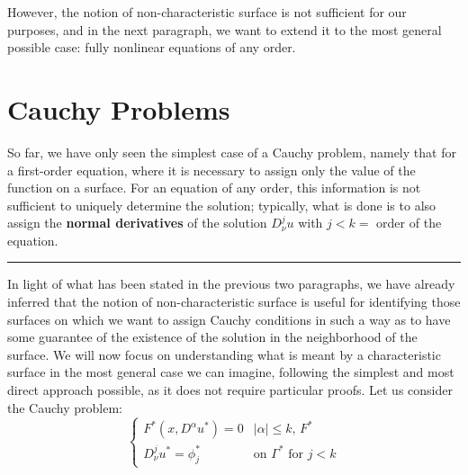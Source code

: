 However, the notion of non-characteristic surface is not sufficient for our purposes, and in the next paragraph, we want to extend it to the most general possible case: fully nonlinear equations of any order.

\newpage
\section{Cauchy Problems} \label{pb}

So far, we have only seen the simplest case of a Cauchy problem, namely that for a first-order equation, where it is necessary to assign only the value of the function on a surface. For an equation of any order, this information is not sufficient to uniquely determine the solution; typically, what is done is to also assign the \textbf{normal derivatives} of the solution $D^j_\nu u$ with $j<k=$ order of the equation.

\noindent\rule[0.5ex]{\linewidth}{0.2pt}

In light of what has been stated in the previous two paragraphs, we have already inferred that the notion of non-characteristic surface is useful for identifying those surfaces on which we want to assign Cauchy conditions in such a way as to have some guarantee of the existence of the solution in the neighborhood of the surface. We will now focus on understanding what is meant by a characteristic surface in the most general case we can imagine, following the simplest and most direct approach possible, as it does not require particular proofs.
Let us consider the Cauchy problem:
\begin{equation}
\begin{cases}
F^*(x,D^\alpha u^*)=0 & |\alpha | \leq k, \, F^*\\
D^j_\nu u^* = \phi_j^* & \text{on } \Gamma^* \text{ for } j<k 
\end{cases}
\end{equation}

